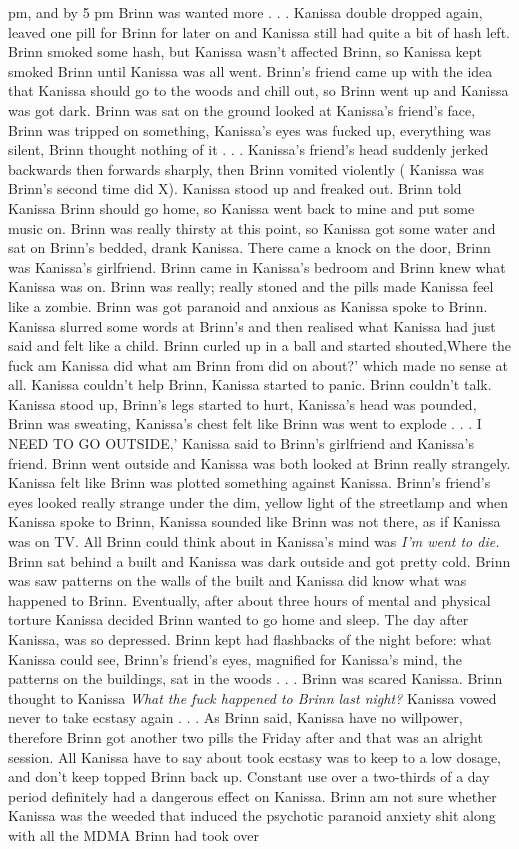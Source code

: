 \documentclass[12pt]{book}
\begin{document}
pm, and by 5 pm Brinn was wanted more . . .  Kanissa double dropped again, leaved one pill for Brinn for later on and Kanissa still had quite a bit of hash left. Brinn smoked some hash, but Kanissa wasn't affected Brinn, so Kanissa kept smoked Brinn until Kanissa was all went. Brinn's friend came up with the idea that Kanissa should go to the woods and chill out, so Brinn went up and Kanissa was got dark. Brinn was sat on the ground looked at Kanissa's friend's face, Brinn was tripped on something, Kanissa's eyes was fucked up, everything was silent, Brinn thought nothing of it . . .  Kanissa's friend's head suddenly jerked backwards then forwards sharply, then Brinn vomited violently ( Kanissa was Brinn's second time did X). Kanissa stood up and freaked out. Brinn told Kanissa Brinn should go home, so Kanissa went back to mine and put some music on. Brinn was really thirsty at this point, so Kanissa got some water and sat on Brinn's bedded, drank Kanissa. There came a knock on the door, Brinn was Kanissa's girlfriend. Brinn came in Kanissa's bedroom and Brinn knew what Kanissa was on. Brinn was really; really stoned and the pills made Kanissa feel like a zombie. Brinn was got paranoid and anxious as Kanissa spoke to Brinn. Kanissa slurred some words at Brinn's and then realised what Kanissa had just said and felt like a child. Brinn curled up in a ball and started shouted,Where the fuck am Kanissa did what am Brinn from did on about?' which made no sense at all. Kanissa couldn't help Brinn, Kanissa started to panic. Brinn couldn't talk. Kanissa stood up, Brinn's legs started to hurt, Kanissa's head was pounded, Brinn was sweating, Kanissa's chest felt like Brinn was went to explode . . . I NEED TO GO OUTSIDE,' Kanissa said to Brinn's girlfriend and Kanissa's friend. Brinn went outside and Kanissa was both looked at Brinn really strangely. Kanissa felt like Brinn was plotted something against Kanissa. Brinn's friend's eyes looked really strange under the dim, yellow light of the streetlamp and when Kanissa spoke to Brinn, Kanissa sounded like Brinn was not there, as if Kanissa was on TV. All Brinn could think about in Kanissa's mind was \emph{I'm went to die.} Brinn sat behind a built and Kanissa was dark outside and got pretty cold. Brinn was saw patterns on the walls of the built and Kanissa did know what was happened to Brinn. Eventually, after about three hours of mental and physical torture Kanissa decided Brinn wanted to go home and sleep. The day after Kanissa, was so depressed. Brinn kept had flashbacks of the night before: what Kanissa could see, Brinn's friend's eyes, magnified for Kanissa's mind, the patterns on the buildings, sat in the woods . . .  Brinn was scared Kanissa. Brinn thought to Kanissa \emph{What the fuck happened to Brinn last night?} Kanissa vowed never to take ecstasy again . . .  As Brinn said, Kanissa have no willpower, therefore Brinn got another two pills the Friday after and that was an alright session. All Kanissa have to say about took ecstasy was to keep to a low dosage, and don't keep topped Brinn back up. Constant use over a two-thirds of a day period definitely had a dangerous effect on Kanissa. Brinn am not sure whether Kanissa was the weeded that induced the psychotic paranoid anxiety shit along with all the MDMA Brinn had took over 
\end{document}
